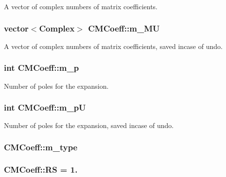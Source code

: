 A vector of complex numbers of matrix coefficients. 

\hypertarget{classCMCoeff_a2fc4617b2a37d2ca033aea2f5e02b5de}{
\subsubsection[{m\-\_\-\-M\-U}]{\setlength{\rightskip}{0pt plus 5cm}vector$<${\bf Complex}$>$ C\-M\-Coeff\-::m\-\_\-\-M\-U\hspace{0.3cm}{\ttfamily [protected]}}}\label{classCMCoeff_a2fc4617b2a37d2ca033aea2f5e02b5de}


A vector of complex numbers of matrix coefficients, saved incase of undo. 

\hypertarget{classCMCoeff_adf49f0bd55b7c496b887f547695aba38}{
\subsubsection[{m\-\_\-p}]{\setlength{\rightskip}{0pt plus 5cm}int C\-M\-Coeff\-::m\-\_\-p\hspace{0.3cm}{\ttfamily [protected]}}}\label{classCMCoeff_adf49f0bd55b7c496b887f547695aba38}


Number of poles for the expansion. 

\hypertarget{classCMCoeff_ac00d5938d669575bf71826ee725ccf46}{
\subsubsection[{m\-\_\-p\-U}]{\setlength{\rightskip}{0pt plus 5cm}int C\-M\-Coeff\-::m\-\_\-p\-U\hspace{0.3cm}{\ttfamily [protected]}}}\label{classCMCoeff_ac00d5938d669575bf71826ee725ccf46}


Number of poles for the expansion, saved incase of undo. 

\hypertarget{classCMCoeff_afe0cd2c61d33f32a058302fb53c33ccf}{
\subsubsection[{m\-\_\-type}]{ C\-M\-Coeff\-::m\-\_\-type\hspace{0.3cm}{\ttfamily [protected]}}}\label{classCMCoeff_afe0cd2c61d33f32a058302fb53c33ccf}
\hypertarget{classCMCoeff_a512caa3ff1994cbde85011489b8f34ce}{
\subsubsection[{R\-S}]{ C\-M\-Coeff\-::\-R\-S = 1.\hspace{0.3cm}{\ttfamily [static]}}}\label{classCMCoeff_a512caa3ff1994cbde85011489b8f34ce}


